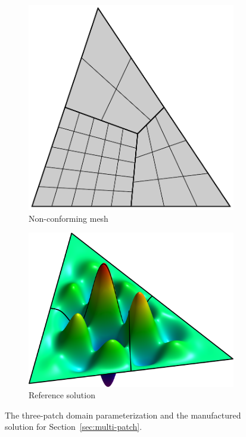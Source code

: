 \documentclass[preprint,12pt]{elsarticle}
\theoremstyle{remark}
\begin{document}
\begin{figure}[hbt]
    \centering
    \begin{subfigure}[b]{0.43\textwidth}
        \includegraphics[width=\textwidth]{three_patch_basic}
        \caption{Non-conforming mesh}
    \end{subfigure}
    \begin{subfigure}[b]{0.53\textwidth}
        \includegraphics[width=\textwidth]{three_patches_solution-plot}
        \caption{Reference solution}
    \end{subfigure}
	\caption{The three-patch domain parameterization and the manufactured solution for Section~\ref{sec:multi-patch}.}\label{fig:three_patch_biharmonic_problem}
\end{figure}
\end{document}
